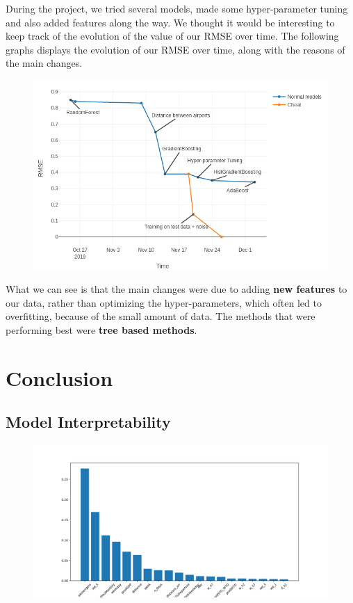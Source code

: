 \documentclass[a4paper,12pt,twoside]{article}
\begin{document}
During the project, we tried several models, made some hyper-parameter tuning and also added features along the way. We thought it would be interesting to keep track of the evolution of the value of our RMSE over time.
The following graphs displays the evolution of our RMSE over time, along with the reasons of the main changes.

\begin{figure}[H]
	\centering
	\includegraphics[scale=0.4]{rmse_evolution.png}
\end{figure}

What we can see is that the main changes were due to adding \textbf{new features} to our data, rather than optimizing the hyper-parameters, which often led to overfitting, because of the small amount of data. The methods that were performing best were \textbf{tree based methods}.

\section{Conclusion}

\subsection{Model Interpretability}

\begin{figure}[H]
	\centering
	\includegraphics[scale=0.4]{feature_importance.png}
\end{figure}
\end{document}
